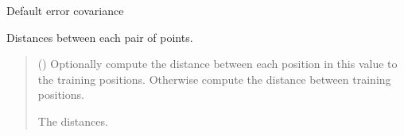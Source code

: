 \documentclass[letterpaper,10pt,english]{sphinxmanual}
\begin{document}
\begin{fulllineitems}
\begin{fulllineitems}
\begin{quote}
\begin{description}
\sphinxAtStartPar
{}

\end{description}\end{quote}

\end{fulllineitems}


\begin{fulllineitems}
\label{\detokenize{splines:glomar_gridding.spline.Spline.default_error_cov}}
\pysigstartsignatures
\pysigline
{}
\pysigstopsignatures
\sphinxAtStartPar
Default error covariance

\end{fulllineitems}


\begin{fulllineitems}
\label{\detokenize{splines:glomar_gridding.spline.Spline.dist_func}}
\pysigstartsignatures
\pysiglinewithargsret
{}
{}
{}
\pysigstopsignatures
\sphinxAtStartPar
Distances between each pair of points.
\begin{quote}\begin{description}
\sphinxAtStartPar
{} () \textendash{} Optionally compute the distance between each position in this value
to the training positions. Otherwise compute the distance between
training positions.

\sphinxAtStartPar
{} \textendash{} The distances.

\sphinxAtStartPar
{}


\end{description}
\end{quote}
\end{fulllineitems}
\end{fulllineitems}
\end{document}
